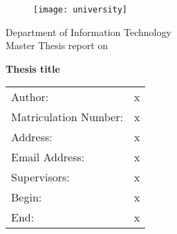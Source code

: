 \begin{titlepage}
\begin{center}
\begin{figure}
    \centering
    \texttt{[image: university]}
\end{figure}
\vspace*{1cm}
       \normalsize
        Department of Information Technology\\
        Master Thesis report on

       \vspace{0.5cm}
       
       \Large{\textbf{Thesis title}} 

               
       \vspace{8cm}
       \normalsize
            \begin{tabular}{ l l }
               Author:&x \\
               Matriculation Number:&x\\
               Address:&x\\
               Email Address:&x\\
               Supervisors:&x\\
               Begin:&x\\
               End:&x\\
            \end{tabular}
\end{center}
\end{titlepage}